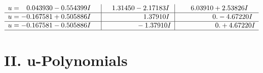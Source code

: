 \documentclass[1p]{elsarticle_modified}
\theoremstyle{definition}
\begin{document}
$$\begin{array}{c|c|c}
\begin{aligned}
u &= \phantom{-}0.043930 - 0.554399 I\end{aligned}
 & \phantom{-}1.31450 - 2.17183 I & \phantom{-}6.03910 + 2.53826 I \\ \hline\begin{aligned}
u &= -0.167581 + 0.505886 I\end{aligned}
 & \phantom{-0.000000 -}1.37910 I & \phantom{-0.000000 } 0. - 4.67220 I \\ \hline\begin{aligned}
u &= -0.167581 - 0.505886 I\end{aligned}
 & \phantom{-0.000000 } -1.37910 I & \phantom{-0.000000 -}0. + 4.67220 I\\
 \hline 
 \end{array}$$\newpage
\newpage\renewcommand{\arraystretch}{1}
\centering \section*{ II. u-Polynomials}
\end{document}
